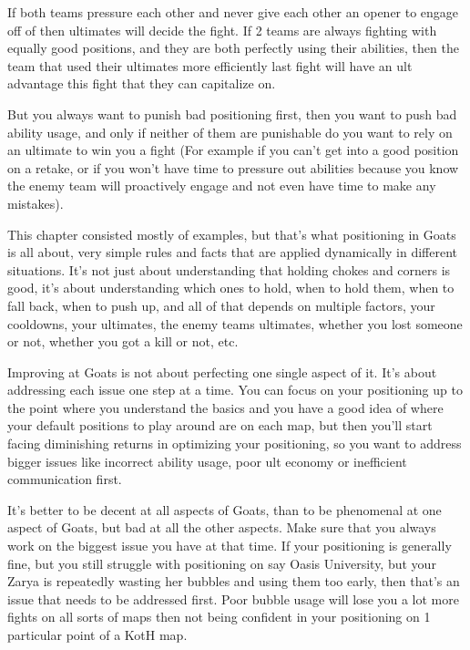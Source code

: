 If both teams pressure each other and never give each other an opener to engage off of then ultimates will decide the fight. If 2 teams are always fighting with equally good positions, and they are both perfectly using their abilities, then the team that used their ultimates more efficiently last fight will have an ult advantage this fight that they can capitalize on.

But you always want to punish bad positioning first, then you want to push bad ability usage, and only if neither of them are punishable do you want to rely on an ultimate to win you a fight (For example if you can’t get into a good position on a retake, or if you won’t have time to pressure out abilities because you know the enemy team will proactively engage and not even have time to make any mistakes). 

This chapter consisted mostly of examples, but that’s what positioning in Goats is all about, very simple rules and facts that are applied dynamically in different situations. It’s not just about understanding that holding chokes and corners is good, it’s about understanding which ones to hold, when to hold them, when to fall back, when to push up, and all of that depends on multiple factors, your cooldowns, your ultimates, the enemy teams ultimates, whether you lost someone or not, whether you got a kill or not, etc.



Improving at Goats is not about perfecting one single aspect of it. It’s about addressing each issue one step at a time. You can focus on your positioning up to the point where you understand the basics and you have a good idea of where your default positions to play around are on each map, but then you’ll start facing diminishing returns in optimizing your positioning, so you want to address bigger issues like incorrect ability usage, poor ult economy or inefficient communication first.

It’s better to be decent at all aspects of Goats, than to be phenomenal at one aspect of Goats, but bad at all the other aspects. Make sure that you always work on the biggest issue you have at that time. If your positioning is generally fine, but you still struggle with positioning on say Oasis University, but your Zarya is repeatedly wasting her bubbles and using them too early, then that’s an issue that needs to be addressed first. Poor bubble usage will lose you a lot more fights on all sorts of maps then not being confident in your positioning on 1 particular point of a KotH map.

